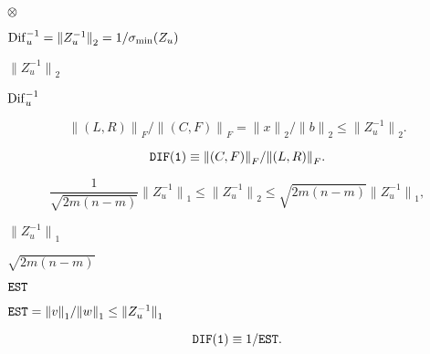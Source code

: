 {\newpage\clearpage
{}%
$\otimes$%
\lthtmlinlinemathZ
\lthtmlcheckvsize\clearpage}

{\newpage\clearpage
{}%
${\rm Dif}_u^{-1} = {\|Z_u^{-1}\|}_2 = 1 / \sigma_{\min} (Z_u)$%
\lthtmlinlinemathZ
\lthtmlcheckvsize\clearpage}

{\newpage\clearpage
{}%
${\|Z_u^{-1}\|}_2$%
\lthtmlinlinemathZ
\lthtmlcheckvsize\clearpage}

{\newpage\clearpage
{}%
${\rm Dif}_u^{-1}$%
\lthtmlinlinemathZ
\lthtmlcheckvsize\clearpage}

{\newpage\clearpage
{}%
\begin{displaymath}
{\|(L, R)\|}_F / {\|(C, F)\|}_F = {\|x\|}_2 / {\|b\|}_2 \leq {\|Z_u^{-1}\|}_2 .
\end{displaymath}%
\lthtmldisplayZ
\lthtmlcheckvsize\clearpage}

{\newpage\clearpage
{}%
\begin{displaymath}
{\tt DIF(1)} \equiv {\|(C, F)\|}_F / {\|(L, R)\|}_F  .
\end{displaymath}%
\lthtmldisplayZ
\lthtmlcheckvsize\clearpage}

{\newpage\clearpage
{}%
\begin{displaymath}
\frac{1}{\sqrt{2m(n-m)}} {\|Z_u^{-1}\|}_{1} \leq {\|Z_u^{-1}\|}_2 \leq \sqrt{2m(n-m)}
{\|Z_u^{-1}\|}_{1},
\end{displaymath}%
\lthtmldisplayZ
\lthtmlcheckvsize\clearpage}

{\newpage\clearpage
{}%
${\|Z_u^{-1}\|}_{1}$%
\lthtmlinlinemathZ
\lthtmlcheckvsize\clearpage}

{\newpage\clearpage
{}%
$\sqrt{2m(n -m)}$%
\lthtmlinlinemathZ
\lthtmlcheckvsize\clearpage}

{\newpage\clearpage
{}%
${\tt EST}$%
\lthtmlinlinemathZ
\lthtmlcheckvsize\clearpage}

{\newpage\clearpage
{}%
${\tt EST}
= {\|v\|}_{1}/ {\|w\|}_{1} \leq {\|Z_u^{-1}\|}_{1}$%
\lthtmlinlinemathZ
\lthtmlcheckvsize\clearpage}

{\newpage\clearpage
{}%
\begin{displaymath}
{\tt DIF(1)} \equiv 1 / {\tt EST} .
\end{displaymath}%
\lthtmldisplayZ
\lthtmlcheckvsize\clearpage}

